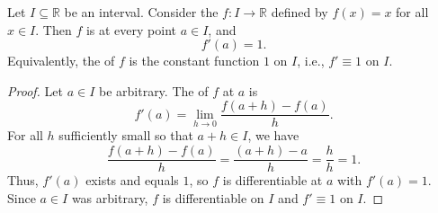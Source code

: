 \begin{proposition} \label{proposition:derivative_of_the_identity_function_on_a_real_interval_is_one}
    Let $I \subseteq \mathbb{R}$ be an interval. Consider the  $f : I \to \mathbb{R}$ defined by $f(x) = x$ for all $x \in I$. Then $f$ is  at every point $a \in I$, and
    $$f'(a) = 1.$$
    Equivalently, the  of $f$ is the constant function $1$ on $I$, i.e., $f' \equiv 1$ on $I$.
\end{proposition}
\begin{proof}
    Let $a \in I$ be arbitrary. The  of $f$ at $a$ is
    $$f'(a) = \lim_{h \to 0} \frac{f(a+h) - f(a)}{h}.$$
    For all $h$ sufficiently small so that $a+h \in I$, we have 
    $$\frac{f(a+h) - f(a)}{h} = \frac{(a+h) - a}{h} = \frac{h}{h} = 1.$$
    Thus, $f'(a)$ exists and equals $1$, so $f$ is differentiable at $a$ with $f'(a) = 1$. Since $a \in I$ was arbitrary, $f$ is differentiable on $I$ and $f' \equiv 1$ on $I$.
\end{proof}